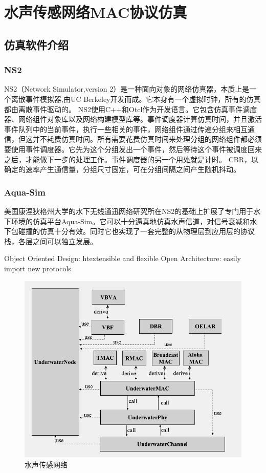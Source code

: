 \chapter{水声传感网络MAC协议仿真}
\section {仿真软件介绍}
\subsection{NS2}
NS2（Network Simulator,version 2）是一种面向对象的网络仿真器，本质上是一个离散事件模拟器,由UC Berkeley开发而成。它本身有一个虚拟时钟，所有的仿真都由离散事件驱动的。
NS2使用C++和Otcl作为开发语言。它包含仿真事件调度器、网络组件对象库以及网络构建模型库等。事件调度器计算仿真时间，并且激活事件队列中的当前事件，执行一些相关的事件，网络组件通过传递分组来相互通信，但这并不耗费仿真时间。所有需要花费仿真时间来处理分组的网络组件都必须要使用事件调度器。它先为这个分组发出一个事件，然后等待这个事件被调度回来之后，才能做下一步的处理工作。事件调度器的另一个用处就是计时。
CBR，以确定的速率产生通信量，分组尺寸固定，可在分组间隔之间产生随机抖动。
\subsection{Aqua-Sim}
美国康涅狄格州大学的水下无线通迅网络研究所在NS2的基础上扩展了专门用于水下环境的仿真平台Aqua-Sim。它可以十分逼真地仿真水声信道，对信号衰减和水下包碰撞的仿真十分有效。同时它也实现了一套完整的从物理层到应用层的协议栈，各层之间可以独立发展。
 
 Object Oriented Design: htextensible and flexible
 Open Architecture: easily import new protocols
 
 \begin{figure}[ht]
 	\centering
 	\includegraphics[scale=0.5]{figures/aq.png}
 	\caption{
 		水声传感网络
 	}
 	\label{fig:example}
 \end{figure}
